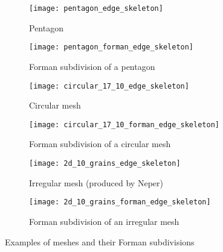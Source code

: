 \begin{figure}[!ht]
  \begin{subfigure}{.5\textwidth}
    \centering
    \texttt{[image: pentagon\_edge\_skeleton]}
    \caption{Pentagon}
  \end{subfigure}
  \begin{subfigure}{.5\textwidth}
    \centering
    \texttt{[image: pentagon\_forman\_edge\_skeleton]}
    \caption{Forman subdivision of a pentagon}
  \end{subfigure}

  \begin{subfigure}{.5\textwidth}
    \centering
    \texttt{[image: circular\_17\_10\_edge\_skeleton]}
    \caption{Circular mesh}
  \end{subfigure}
  \begin{subfigure}{.5\textwidth}
    \centering
    \texttt{[image: circular\_17\_10\_forman\_edge\_skeleton]}
    \caption{Forman subdivision of a circular mesh}
  \end{subfigure}

  \begin{subfigure}{.5\textwidth}
    \centering
    \texttt{[image: 2d\_10\_grains\_edge\_skeleton]}
    \caption{Irregular mesh (produced by Neper)}
  \end{subfigure}
  \begin{subfigure}{.5\textwidth}
    \centering
    \texttt{[image: 2d\_10\_grains\_forman\_edge\_skeleton]}
    \caption{Forman subdivision of an irregular mesh}
  \end{subfigure}
  \caption{Examples of meshes and their Forman subdivisions}
  \label{figure:mesh/forman_subdivision_examples}
\end{figure}
